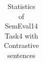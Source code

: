 \begin{table}
{\begin{tabular}{l|c|c}
    \hline
    \end{tabular}
}
\caption{Statistics of SemEval14 Task4 with Contrastive sentences}
\label{chap6:tbl:asc}
\end{table}





